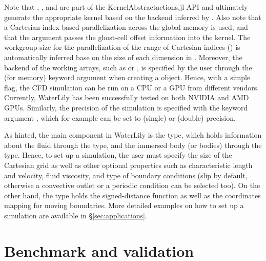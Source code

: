 \documentclass[final,3p,times]{elsarticle}
\begin{document}
Note that , ,  and  are part of the KernelAbstractactions.jl API and ultimately generate the appropriate kernel based on the backend inferred by . Also note that a Cartesian-index based parallelization across the global memory is used, and that the  argument passes the ghost-cell offset information into the kernel. The workgroup size for the parallelization of the range of Cartesian indices () is automatically inferred base on the size of each dimension in . Moreover, the backend of the working arrays, such as  or , is specified by the user through the  (for memory) keyword argument when creating a  object. Hence, with a simple flag, the CFD simulation can be run on a CPU or a GPU from different vendors. Currently, WaterLily has been successfully tested on both NVIDIA and AMD GPUs. Similarly, the precision of the simulation is specified with the keyword argument , which for example can be set to  (single) or  (double) precision.

As hinted, the main component in WaterLily is the  type, which holds information about the fluid through the  type, and the immersed body (or bodies) through the  type. Hence, to set up a simulation, the user must specify the size of the Cartesian grid as well as other optional properties such as characteristic length and velocity, fluid viscosity, and type of boundary conditions (slip by default, otherwise a convective outlet or a periodic condition can be selected too). On the other hand, the  type holds the signed-distance function as well as the coordinates mapping for moving boundaries. More detailed examples on how to set up a simulation are available in \S\ref{sec:applications}.

\section{Benchmark and validation} \label{sec:benchmark_validation}
\end{document}
